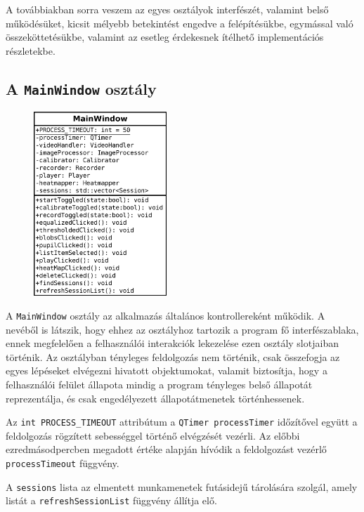 A továbbiakban sorra veszem az egyes osztályok interfészét, valamint belső működésüket, kicsit mélyebb betekintést engedve a felépítésükbe, egymással való összeköttetésükbe, valamint az esetleg érdekesnek ítélhető implementációs részletekbe.

\subsection{A \texttt{MainWindow} osztály}\label{sect:mainwindow}

\begin{figure}[!ht]
\centering
\includegraphics[width=50mm, keepaspectratio]{figures/class_mainwindow.png}
\end{figure}

A \texttt{MainWindow} osztály az alkalmazás általános kontrollereként működik. A nevéből is látszik, hogy ehhez az osztályhoz tartozik a program fő interfészablaka, ennek megfelelően a felhasználói interakciók lekezelése ezen osztály slotjaiban történik. Az osztályban tényleges feldolgozás nem történik, csak összefogja az egyes lépéseket elvégezni hivatott objektumokat, valamit biztosítja, hogy a felhasználói felület állapota mindig a program tényleges belső állapotát reprezentálja, és csak engedélyezett állapotátmenetek történhessenek.

\bigskip

Az \texttt{int PROCESS\_TIMEOUT} attribútum a \texttt{QTimer processTimer} időzítővel együtt a feldolgozás rögzített sebességgel történő elvégzését vezérli. Az előbbi ezredmásodpercben megadott értéke alapján hívódik a feldolgozást vezérlő \texttt{processTimeout} függvény.

A \texttt{sessions} lista az elmentett munkamenetek futásidejű tárolására szolgál, amely listát a \texttt{refreshSessionList} függvény állítja elő.

